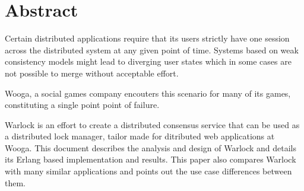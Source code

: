 \chapter{Abstract}

Certain distributed applications require that its users strictly have one
session across the distributed system at any given point of time. Systems
based on weak consistency models might lead to diverging user states which
in some cases are not possible to merge without acceptable effort.

Wooga, a social games company encouters this scenario for many of its
games, constituting a single point point of failure.

Warlock is an effort to create a distributed consensus service that can
be used as a distributed lock manager, tailor made for ditributed web
applications at Wooga. This document describes the analysis and design of
Warlock and details its Erlang based implementation and results. 
This paper also compares Warlock with many similar applications and points
out the use case differences between them.
